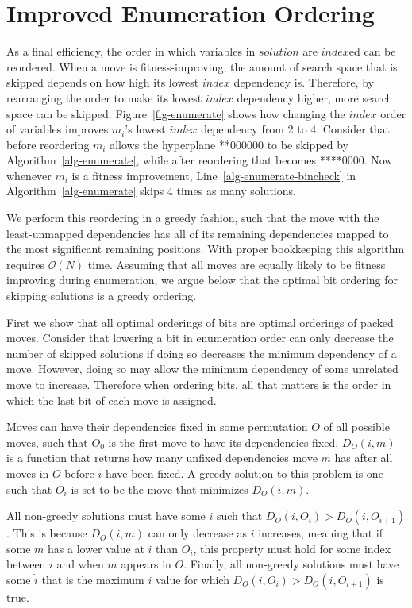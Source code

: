 \documentclass[runningheads,a4paper]{llncs}
\newcommand{\BigO}[1]{$\mathcal{O}{(#1)}$}
\begin{document}
\section{Improved Enumeration Ordering}
As a final efficiency, the order in which variables in $solution$ are $index$ed can be reordered.
When a move is fitness-improving,
the amount of search space that is skipped depends on how high its lowest $index$ dependency is. Therefore,
by rearranging the order to make its lowest $index$ dependency higher, more search space can be skipped. 
Figure~\ref{fig-enumerate} shows how changing the $index$ order of variables
improves $m_i$'s lowest $index$ dependency from 2 to 4. Consider that before reordering $m_i$ allows the hyperplane
**000000 to be skipped by Algorithm~\ref{alg-enumerate}, while after reordering that becomes ****0000.
Now whenever $m_i$ is a fitness improvement, Line~\ref{alg-enumerate-bincheck} in Algorithm~\ref{alg-enumerate}
skips 4 times as many solutions.

We perform this reordering in a greedy fashion, such that the move with the
least-unmapped dependencies has all of its remaining dependencies mapped to the
most significant remaining positions. With proper bookkeeping this algorithm requires
\BigO{N} time. Assuming that all moves are equally likely to be fitness improving
during enumeration, we argue below that the optimal bit ordering for skipping solutions is a greedy
ordering.

First we show that all optimal orderings of bits are optimal orderings of packed moves.
Consider that lowering a bit in enumeration order can only decrease the number of skipped
solutions if doing so decreases the minimum dependency of a move. However, doing so may
allow the minimum dependency of some unrelated move to increase. Therefore when ordering
bits, all that matters is the order in which the last bit of each move is assigned.

Moves can have their dependencies fixed in some permutation $O$ of all possible moves,
such that $O_0$ is the first move to have its dependencies fixed.
$D_O(i, m)$ is a function that returns how many unfixed dependencies move $m$ has after all
moves in $O$ before $i$ have been fixed. A greedy solution to this problem is one such
that $O_i$ is set to be the move that minimizes $D_O(i, m)$.

All non-greedy solutions must have some $i$ such that $D_O(i, O_i) > D_O(i, O_{i+1})$.
This is because $D_O(i, m)$ can only decrease as $i$ increases, meaning that if some $m$
has a lower value at $i$ than $O_i$, this property must hold for
some index between $i$ and when $m$ appears in $O$.
Finally, all non-greedy solutions must have some $\hat{i}$
that is the maximum $i$ value for which $D_O(i, O_i) > D_O(i, O_{i+1})$ is true. 
\end{document}
